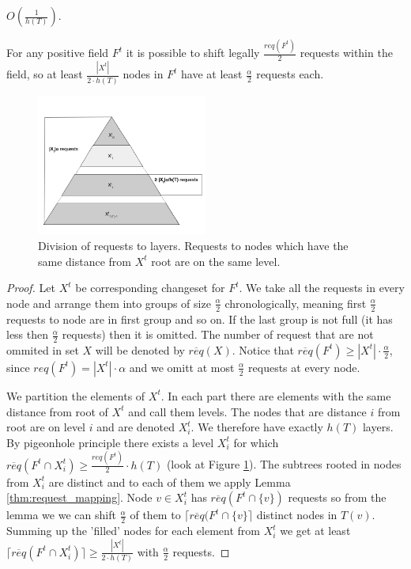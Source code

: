 $O(\frac{1}{h(T)})$.
\begin{lemma}
For any positive field $F^t$ it is possible to shift 
legally $\frac{req(F^t)}{2}$ requests within the field, so at least 
$\frac{|X^t|}{2 \cdot h(T)}$ nodes in $F^t$ have at least 
$\frac{\alpha}{2}$ requests each.
\label{thm:legal_shifting_down}
\end{lemma}
 \begin{figure}
 \begin{center}
  \includegraphics[width=0.5\textwidth]{layers.png}
\end{center}
\caption{Division of requests to layers. Requests to nodes which have the same 
distance from $X^t$ root are on the same level.}
\label{fig:layers}
\end{figure}
\begin{proof}
Let $X^t$ be corresponding changeset for $F^t$. We take all the requests in 
every node and arrange them into groups of size $\frac{\alpha}{2}$ 
chronologically, meaning first $\frac{\alpha}{2}$ requests to node are in first 
group and so on. If the last group is not full (it has less then  
$\frac{\alpha}{2}$ requests) then it is omitted. The number of request that are 
not ommited in set $X$ will be denoted by $\overline{req}(X)$. Notice that  
$\overline{req}(F^t) \geq |X^t| \cdot \frac{\alpha}{2}$, since $req(F^t) = 
|X^t| \cdot \alpha$ and we omitt at most $\frac{\alpha}{2}$ requests at every 
node.

We partition the elements of $X^t$. In each part there are elements with the 
same distance from root of $X^t$ and call them levels. The nodes that are 
distance $i$ from root are on level $i$ and are denoted $X^t_i$. We therefore 
have exactly $h(T)$ layers. By pigeonhole principle there exists a level 
$X^t_i$ for which $\overline{req}(F^t \cap X^t_i) \geq \frac{req(F^t)}{2} \cdot 
h(T)$ (look at Figure \ref{fig:layers}). The subtrees rooted in nodes from 
$X^t_i$ are distinct and to each of them we apply Lemma 
\ref{thm:request_mapping}. Node $v \in X^t_i$ has $\overline{req}(F^t \cap 
\{v\})$ requests so from the lemma we we can shift $\frac{\alpha}{2}$ of 
them to $\lceil \overline{req}(F^t \cap \{v\} \rceil$ distinct nodes in $T(v)$. 
Summing up the 'filled' nodes for each element from $X^t_i$ we get at least 
$\lceil \overline{req}(F^t \cap X^t_i) \rceil \geq \frac{|X^t|}{2 \cdot h(T)}$ 
with $\frac{\alpha}{2}$ requests.
\end{proof}
